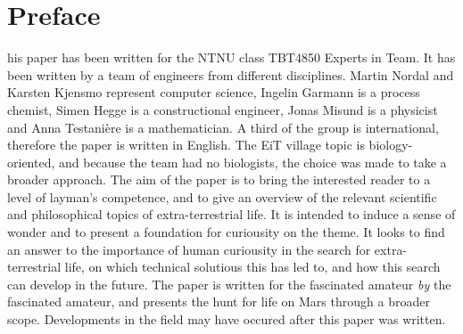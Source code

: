 \section*{Preface}
his paper has been written for the NTNU class TBT4850 Experts in Team.
It has been written by a team of engineers from different disciplines.
Martin Nordal and Karsten Kjensmo represent computer science, Ingelin Garmann is a process chemist, Simen Hegge is a constructional engineer, Jonas Misund is a physicist and Anna Testani\`{e}re is a mathematician.
A third of the group is international, therefore the paper is written in English. 
The EiT village topic is biology-oriented, and because the team had no biologists, the choice was made to take a broader approach. 
The aim of the paper is to bring the interested reader to a level of layman's competence, and to give an overview of the relevant scientific and philosophical topics of extra-terrestrial life.
It is intended to induce a sense of wonder and to present a foundation for curiousity on the theme. It looks to find an answer to the importance of human curiousity in the search for extra-terrestrial life, on which technical solutious this has led to, and how this search can develop in the future.  
The paper is written for the fascinated amateur \emph{by} the fascinated amateur, and presents the hunt for life on Mars through a broader scope. 
Developments in the field may have occured after this paper was written. 